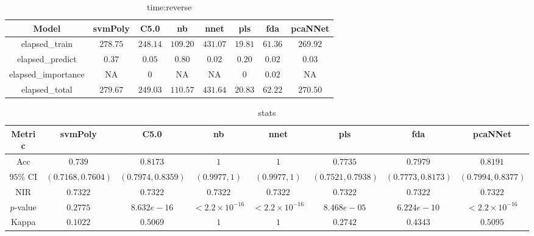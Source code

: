 \begin{table}[!ht]
	\centering
	\begin{tabular}{|c|c|c|c|c|c|c|c|}
		\hline
		Model & svmPoly & C5.0 & nb & nnet & pls & fda & pcaNNet \\ \hline
		elapsed_train & $278.75$ & $248.14$ & $109.20$ & $431.07$ & $19.81$ & $61.36$ & $269.92$ \\ \hline
		elapsed_predict & $0.37$ & $0.05$ & $0.80$ & $0.02$ & $0.20$ & $0.02$ & $0.03$ \\ \hline
		elapsed_importance & NA & $0$ & NA & NA & $0$ & $0.02$ & NA \\ \hline
		elapsed_total & $279.67$ & $249.03$ & $110.57$ & $431.64$ & $20.83$ & $62.22$ & $270.50$ \\ \hline
	\end{tabular}
	\caption{time:reverse}
	\label{tab:time:reverse}
\end{table}

\begin{table}[!ht]
	\centering
	\begin{tabular}{|c|c|c|c|c|c|c|c|}
		\hline
		Metric & svmPoly & C5.0 & nb & nnet & pls & fda & pcaNNet \\ \hline
		Acc & $0.739$ & $0.8173$ & $1$ & $1$ & $0.7735$ & $0.7979$ & $0.8191$ \\ \hline
		$95\%$ CI & $(0.7168, 0.7604)$ & $(0.7974, 0.8359)$ & $(0.9977, 1)$ & $(0.9977, 1)$ & $(0.7521, 0.7938)$ & $(0.7773, 0.8173)$ & $(0.7994, 0.8377)$ \\ \hline
		NIR & $0.7322$ & $0.7322$ & $0.7322$ & $0.7322$ & $0.7322$ & $0.7322$ & $0.7322$ \\ \hline
		$p$-value & $0.2775$ & $8.632e-16$ & $< 2.2 \times {10}^{-16}$ & $< 2.2 \times {10}^{-16}$ & $8.468e-05$ & $6.224e-10$ & $< 2.2 \times {10}^{-16}$ \\ \hline
		Kappa & $0.1022$ & $0.5069$ & $1$ & $1$ & $0.2742$ & $0.4343$ & $0.5095$ \\ \hline
	\end{tabular}
	\caption{stats}
	\label{tab:stats}
\end{table}

